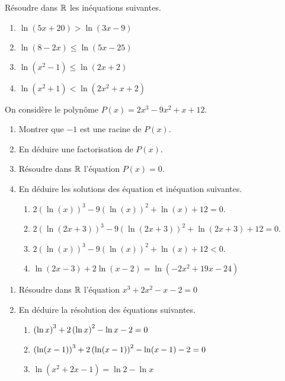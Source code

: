   \begin{exercice}
Résoudre dans $ \mathbb{R} $  les inéquations suivantes.
\begin{enumerate}
\item  $ \ln(5x + 20) > \ln(3x - 9) $
\item $ \ln(8 - 2x) \leq \ln(5x- 25) $ 
\item $ \ln(x^{2}-1) \leq \ln(2x+2 ) $ 
\item $ \ln(x^{2} + 1) < \ln(2x^{2} + x + 2) $

\end{enumerate}

  \end{exercice}
  
   \begin{exercice}
  On considère le polynôme $ P(x)=2x^{3}-9x^{2}+x+12$.
\begin{enumerate}
\item Montrer que $ -1 $  est une racine de $ P(x) $.
\item En déduire une factorisation de $  P(x) $.
\item Résoudre dans $ \mathbb{R} $  l'équation $ P(x)=0 $.
\item En déduire les  solutions des équation  et inéquation suivantes.
\begin{enumerate}
\item $ 2(\ln(x))^{3}-9(\ln(x))^{2}+\ln(x)+12=0 $.
\item $ 2(\ln(2x+3))^{3}-9(\ln(2x+3))^{2}+\ln(2x+3)+12=0 $.
\item $ 2(\ln(x))^{3}-9(\ln(x))^{2}+\ln(x)+12<0 $.
\item $\ln(2x-3) +2\ln(x-2) =\ln(-2x^{2}+19x-24)$
\end{enumerate}
\end{enumerate}
 \end{exercice}
  
 \begin{exercice}

\begin{enumerate} 
\item Résoudre dans $ \mathbb{R} $   l'équation $x^{3}+2x^{2}-x-2=0  $ 
\item En déduire  la résolution des équations suivantes.
\begin{enumerate} 
\item $\left(\ln x\right)^{3}+2\left(\ln x\right)^{2}-\ln x-2=0  $                                                   
\item $\left(\ln (x-1)\right)^{3}+2\left(\ln (x-1)\right)^{2}-\ln (x-1)-2=0  $                                                   
\item $ \ln (x^{2} +2x-1)=\ln 2-\ln x$ 

\end{enumerate}
\end{enumerate}

  \end{exercice}
  

